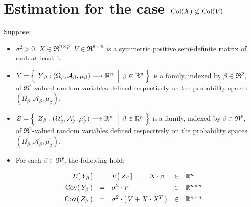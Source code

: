 

\section{Estimation for the case $\textnormal{Col}(X) \not\subset \textnormal{Col}(V)$}
\setcounter{theorem}{0}
\setcounter{equation}{0}

\renewcommand{\theenumi}{\roman{enumi}}
\renewcommand{\labelenumi}{\textnormal{(\theenumi)}$\;\;$}


\begin{theorem}
\mbox{}
\vskip 0.1cm
\noindent
Suppose:
\begin{itemize}
\item
	$\sigma^{2} > 0$.
	\;
	$X \in \Re^{n \times p}$.
	\;
	$V \in \Re^{n \times n}$ is a symmetric positive semi-definite matrix of rank at least 1.
\item
	$Y = \left\{\;
		\left.
		\overset{{\color{white}.}}{Y}_{\beta} : (\Omega_{\beta},\mathcal{A}_{\beta},\mu_{\beta}) \longrightarrow \Re^{n}
		\;\;\right\vert\;
		\beta \in \Re^{p}
		\;\right\}$
	is a family, indexed by $\beta \in \Re^{p}$,
	of $\Re^{n}$-valued random variables defined respectively on the
	probability spaces $(\Omega_{\beta},\mathcal{A}_{\beta},\mu_{\beta})$.
\item
	$Z = \left\{\;
		\left.
		\overset{{\color{white}.}}{Z}_{\beta}
		: (\Omega^{\prime}_{\beta},\mathcal{A}^{\prime}_{\beta},\mu^{\prime}_{\beta}) \longrightarrow \Re^{n}
		\;\;\right\vert\;
		\beta \in \Re^{p}
		\;\right\}$
	is a family, indexed by $\beta \in \Re^{p}$,
	of $\Re^{n}$-valued random variables defined respectively on the
	probability spaces $(\Omega^{\prime}_{\beta},\mathcal{A}^{\prime}_{\beta},\mu^{\prime}_{\beta})$.
\item
	For each $\beta \in \Re^{p}$, the following hold:
	\begin{equation*}
	\begin{array}{rclcl}
	E\!\left[\;Y_{\beta}\,\right]
		& \overset{{\color{white}\vert}}{=} &
		E\!\left[\;Z_{\beta}\,\right] \;\; = \;\; X \cdot \beta & \in & \Re^{n}
	\\
	\Cov\!\left(\,Y_{\beta}\,\right)
		& \overset{{\color{white}\vert}}{=} &
		\sigma^{2} \cdot V & \in & \Re^{n \times n}
	\\
	\Cov\!\left(\,Z_{\beta}\,\right)
		& \overset{{\color{white}\vert}}{=} &
		\sigma^{2} \cdot (\,V+X\cdot X^{T}\,) & \in & \Re^{n \times n}
	\end{array}

\end{equation*}
\end{itemize}
\end{theorem}
